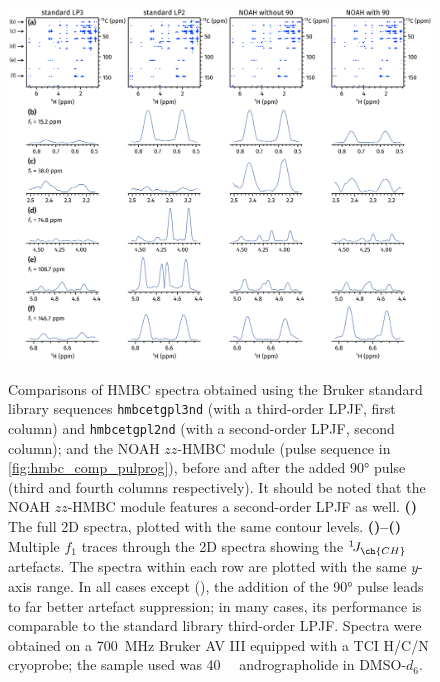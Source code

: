 \documentclass[a4paper,11pt]{article}
\newcommand{\carbon}{\ch{^{13}C}}
\newcommand{\onejch}{{}^1\!J_{\ch{CH}}}
\newcommand*{\andro}{Spectra were obtained on a \SI{700}{\MHz} Bruker AV III equipped with a TCI H/C/N cryoprobe; the sample used was \SI{40}{\milli\molar} andrographolide in DMSO-\(d_6\).}
\begin{document}
\begin{refsection}
\begin{figure}[H]
    \centering
    \includegraphics[width=\textwidth]{hmbc_si_andro.png}
    {\label{fig:hmbc_si_andro_overall}}
    {\label{fig:hmbc_si_andro_trace1}}
    {\label{fig:hmbc_si_andro_trace2}}
    {\label{fig:hmbc_si_andro_trace3}}
    {\label{fig:hmbc_si_andro_trace4}}
    {\label{fig:hmbc_si_andro_trace5}}
    \caption{
        Comparisons of HMBC spectra obtained using the Bruker standard library sequences\autocite{Cicero2001JMR} \texttt{hmbcetgpl3nd} (with a third-order LPJF, first column) and \texttt{hmbcetgpl2nd} (with a second-order LPJF, second column); and the NOAH \(zz\)-HMBC module (pulse sequence in \cref{fig:hmbc_comp_pulprog}), before and after the added \carbon{} \ang{90} pulse (third and fourth columns respectively).
        It should be noted that the NOAH \(zz\)-HMBC module features a second-order LPJF as well.
        \textbf{()} The full 2D spectra, plotted with the same contour levels.
        \textbf{()--()} Multiple \(f_1\) traces through the 2D spectra showing the \(\onejch{}\) artefacts.
        The spectra within each row are plotted with the same \(y\)-axis range.
        In all cases except (), the addition of the \ang{90} pulse leads to far better artefact suppression; in many cases, its performance is comparable to the standard library third-order LPJF.
        \andro{}
    }
    \label{fig:hmbc_si_andro}
\end{figure}


\end{refsection}
\end{document}
